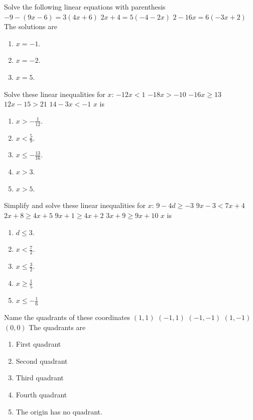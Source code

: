 \begin{ExerciseList}
\Exercise Solve the following linear equations with parenthesis
\Question $-9-(9x - 6) = 3(4x + 6)$
\Question $2x + 4 = 5(-4 - 2x)$
\Question $2 - 16x = 6(-3x + 2)$
\Answer The solutions are
\begin{enumerate}
\item\myindent $x = -1$.
\item\myindent $x = -2$.
\item\myindent $x = 5$.
\end{enumerate}

\Exercise Solve these linear inequalities for $x$:
\Question $-12x < 1$
\Question $-18x > -10$
\Question $−16x \geq 13$
\Question $12x - 15 > 21$
\Question $14 - 3x < -1$
\Answer $x$ is
\begin{enumerate}
\item\myindent $x > -\frac{1}{12}$.
\item\myindent $x < \frac{5}{9}$.
\item\myindent $x \leq -\frac{13}{16}$.
\item\myindent $x>3$.
\item\myindent $x>5$.
\end{enumerate}

\Exercise Simplify and solve these linear inequalities for $x$:
\Question $9 - 4d\geq -3$
\Question $9x - 3 < 7x + 4$
\Question $2x + 8 \geq 4x + 5$
\Question $9x + 1 \geq 4x + 2$
\Question $3x + 9 \geq 9x + 10$
\Answer $x$ is
\begin{enumerate}
\item\myindent $d \leq 3$.
\item\myindent $x < \frac{7}{2}$.
\item\myindent $x \leq \frac{3}{2}$.
\item\myindent $x \geq \frac{1}{5}$
\item\myindent $x \leq -\frac{1}{6}$
\end{enumerate}

\Exercise Name the quadrants of these coordinates
\Question $(1,1)$
\Question $(-1,1)$
\Question $(-1,-1)$
\Question $(1,-1)$
\Question $(0,0)$
\Answer The quadrants are
\begin{enumerate}
\item\myindent First quadrant
\item\myindent Second quadrant
\item\myindent Third quadrant
\item\myindent Fourth quadrant
\item\myindent The origin has no quadrant.
\end{enumerate}


\end{ExerciseList}

